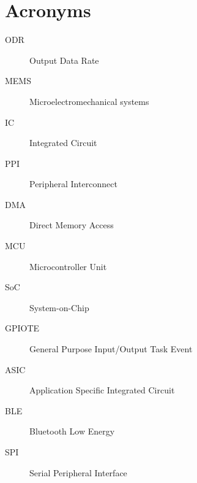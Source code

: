 
\chapter{Acronyms}
\begin{description}
\item[ODR] Output Data Rate
\item[MEMS] Microelectromechanical systems
\item[IC] Integrated Circuit
\item[PPI] Peripheral Interconnect
\item[DMA] Direct Memory Access
\item[MCU] Microcontroller Unit
\item[SoC] System-on-Chip
\item[GPIOTE] General Purpose Input/Output Task Event
\item[ASIC] Application Specific Integrated Circuit
\item[BLE] Bluetooth Low Energy
\item[SPI] Serial Peripheral Interface
\end{description}